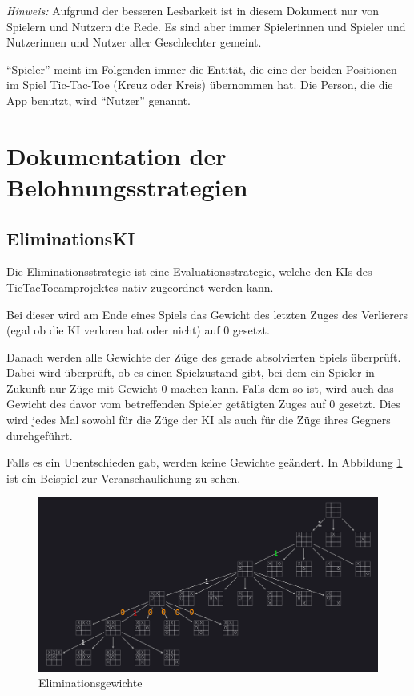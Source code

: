 \documentclass[titlepage]{scrartcl}
\title{\TicTacToe}
\subtitle{Dokumentation}
\date{Stand: \today}
\author{Jonas, Luis, Leonid}
\begin{document}
\maketitle

\emph{Hinweis:} Aufgrund der besseren Lesbarkeit ist in diesem Dokument nur von Spielern und Nutzern die Rede.
Es sind aber immer Spielerinnen und Spieler und Nutzerinnen und Nutzer aller Geschlechter gemeint.

"`Spieler"' meint im Folgenden immer die Entität, die eine der beiden Positionen im Spiel Tic-Tac-Toe (Kreuz oder Kreis) übernommen hat.
Die Person, die die App benutzt, wird "`Nutzer"' genannt.
\section{Dokumentation der Belohnungsstrategien}
\subsection{EliminationsKI}
Die Eliminationsstrategie ist eine Evaluationsstrategie, welche den KIs des TicTacToeamprojektes nativ zugeordnet werden kann.

Bei dieser wird am Ende eines Spiels das Gewicht des letzten Zuges des Verlierers (egal ob die KI verloren hat oder nicht) auf \glqq{}0\grqq{} gesetzt.

Danach werden alle Gewichte der Züge des gerade absolvierten Spiels überprüft. Dabei wird überprüft, ob es einen Spielzustand gibt, bei dem ein Spieler in Zukunft nur Züge mit Gewicht 0 machen kann. Falls dem so ist, wird auch das Gewicht des davor vom betreffenden Spieler getätigten Zuges auf \glqq{}0\grqq{} gesetzt. Dies wird jedes Mal sowohl für die Züge der KI als auch für die Züge ihres Gegners durchgeführt.

Falls es ein Unentschieden gab, werden keine Gewichte geändert. In Abbildung \ref{elimination1} ist ein Beispiel zur Veranschaulichung zu sehen.

\begin{figure}[htb]
\includegraphics[width = \linewidth]{elimination1.png}
\caption{Eliminationsgewichte}
\label{elimination1}
\end{figure}
\end{document}
